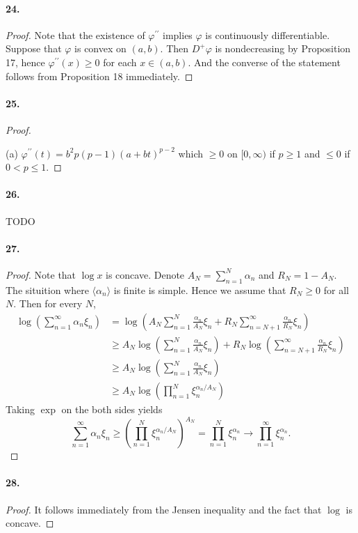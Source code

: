   \paragraph{24.}
  \begin{proof}
    Note that the existence of $\varphi^{\prime\prime}$ implies $\varphi$ is 
    continuously differentiable. Suppose that $\varphi$ is convex on $(a,b)$.
    Then $D^+\varphi$ is nondecreasing by Proposition 17, hence $\varphi^{\prime
    \prime}(x)\ge 0$ for each $x\in(a,b)$. And the converse of the statement
    follows from Proposition 18 immediately. 
  \end{proof}

  \paragraph{25.}
  \begin{proof}
    $\,$\par
    (a) $\varphi^{\prime\prime}(t)=b^2p(p-1)(a+bt)^{p-2}$ which $\ge 0$ on 
    $[0,\infty)$ if $p\ge 1$ and $\le 0$ if $0<p\le 1$.
  \end{proof}

  \paragraph{26.} TODO

  \paragraph{27.}
  \begin{proof}
    Note that $\log x$ is concave. Denote $A_N=\sum_{n=1}^N\alpha_n$ and $R_N=
    1-A_N$. The situition where $\langle\alpha_n\rangle$ is finite is simple. 
    Hence we assume that $R_N\ge 0$ for all $N$. Then for every $N$,
    \begin{align*}
      \log\left(\sum_{n=1}^\infty\alpha_n\xi_n\right)
      &= \log\left(A_N\sum_{n=1}^N\frac{\alpha_n}{A_N}\xi_n + 
         R_N\sum_{n=N+1}^\infty\frac{\alpha_n}{R_N}\xi_n\right) \\
      &\ge A_N\log\left(\sum_{n=1}^N\frac{\alpha_n}{A_N}\xi_n\right) +
           R_N\log\left(\sum_{n=N+1}^\infty\frac{\alpha_n}{R_N}\xi_n\right)\\
      &\ge A_N\log\left(\sum_{n=1}^N\frac{\alpha_n}{A_N}\xi_n\right) \\
      &\ge A_N\log\left(\prod_{n=1}^N\xi_n^{\alpha_n/A_N}\right)
    \end{align*}
    Taking $\exp$ on the both sides yields
    \[
      \sum_{n=1}^\infty\alpha_n\xi_n \ge 
      \left(\prod_{n=1}^N\xi_n^{\alpha_n/A_N}\right)^{A_N} = 
      \prod_{n=1}^N\xi_n^{\alpha_n} \to 
      \prod_{n=1}^\infty\xi_n^{\alpha_n}.
    \]
  \end{proof}

  \paragraph{28.}
  \begin{proof}
    It follows immediately from the Jensen inequality and the fact that $\log$
    is concave.
  \end{proof}


